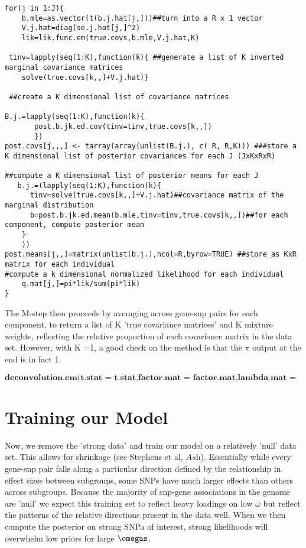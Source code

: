 \documentclass[10pt]{article}
\begin{document}
\begin{verbatim}
for(j in 1:J){
    b.mle=as.vector(t(b.j.hat[j,]))##turn into a R x 1 vector
    V.j.hat=diag(se.j.hat[j,]^2)
    lik=lik.func.em(true.covs,b.mle,V.j.hat,K)

 tinv=lapply(seq(1:K),function(k){ ##generate a list of K inverted marginal covariance matrices
	solve(true.covs[k,,]+V.j.hat)}
 
 ##create a K dimensional list of covariance matrices 

B.j.=lapply(seq(1:K),function(k){
       post.b.jk.ed.cov(tinv=tinv,true.covs[k,,])
       })
post.covs[j,,,] <- tarray(array(unlist(B.j.), c( R, R,K))) ###store a K dimensional list of posterior covariances for each J (JxKxRxR) 
    
##compute a K dimensional list of posterior means for each J
   b.j.=(lapply(seq(1:K),function(k){
      tinv=solve(true.covs[k,,]+V.j.hat)##covariance matrix of the marginal distribution
      b=post.b.jk.ed.mean(b.mle,tinv=tinv,true.covs[k,,])##for each component, compute posterior mean
    }
    ))
post.means[j,,]=matrix(unlist(b.j.),ncol=R,byrow=TRUE) ##store as KxR matrix for each individual
#compute a k dimensional normalized likelihood for each individual 
    q.mat[j,]=pi*lik/sum(pi*lik)
}

\end{verbatim}

The M-step then proceeds by averaging across gene-snp pairs for each component, to return a list of K 'true covariance matrices' and K mixture weights, reflecting the relative proportion of each covariance matrix in the data set. However, with K =1, a good check on the method is that the $\pi$ output at the end is in fact 1.

$\textbf{deconvolution.em(t.stat = t.stat,factor.mat = factor.mat,lambda.mat = lambda.mat,K = 1,P=2,permsnp = 1000)}$






\section{Training our Model}

Now, we remove the 'strong data' and train our model on a relatively 'null' data set. This allows for shrinkage (see Stephens et al, $\textit{Ash}$). Essentially while every gene-snp pair falls along a particular direction defined by the relationship in effect sizes between subgroups, some SNPs have much larger effects than others across subgroups. Because the majority of snp-gene associations in the genome are 'null' we expect this training set to reflect heavy loadings on low $\omega$ but reflect the patterns of the relative directions present in the data well. When we then compute the posterior on strong SNPa of interest, strong likelihoods will overwhelm low priors for large $\omegas$.
\end{document}
